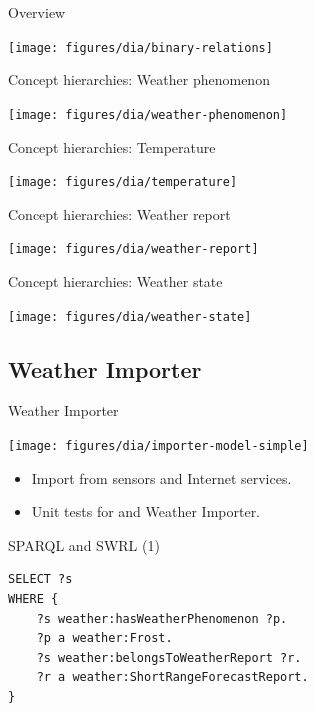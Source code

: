 \documentclass{beamer}
\begin{document}
\begin{frame}{Overview}
	\begin{center}
		\texttt{[image: figures/dia/binary-relations]}
	\end{center}
\end{frame}

\begin{frame}{Concept hierarchies: Weather phenomenon}
	\begin{center}
		\texttt{[image: figures/dia/weather-phenomenon]}
	\end{center}
\end{frame}

\begin{frame}{Concept hierarchies: Temperature}
	\begin{center}
		\texttt{[image: figures/dia/temperature]}
	\end{center}
\end{frame}

\begin{frame}{Concept hierarchies: Weather report}
	\begin{center}
		\texttt{[image: figures/dia/weather-report]}
	\end{center}
\end{frame}

\begin{frame}{Concept hierarchies: Weather state}
	\begin{center}
		\texttt{[image: figures/dia/weather-state]}
	\end{center}
\end{frame}

\subsection{Weather Importer}

\begin{frame}{Weather Importer}
	\begin{center}
		\texttt{[image: figures/dia/importer-model-simple]}
	\end{center}

	\begin{itemize}
		\item Import from sensors and Internet services.
		\item Unit tests for \smarthomeweather and Weather Importer.
	\end{itemize}
\end{frame}

\begin{frame}[fragile]{SPARQL and SWRL (1)}
	\begin{framed}
		\begin{verbatim}
SELECT ?s
WHERE {
    ?s weather:hasWeatherPhenomenon ?p.
    ?p a weather:Frost.
    ?s weather:belongsToWeatherReport ?r.
    ?r a weather:ShortRangeForecastReport.
}
		\end{verbatim}
	\end{framed}
\end{frame}
\end{document}
